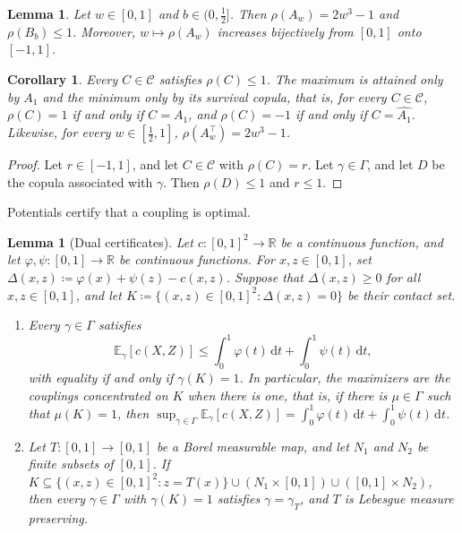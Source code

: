 \documentclass{article}
\newcommand{\E}{\mathbb{E}}
\newcommand{\CC}{\mathcal{C}}
\newcommand{\Gam}{\Gamma}
\newcommand{\R}{\mathbb{R}}
\newcommand{\de}{\,\mathrm{d}}
\newtheorem{lemma}[theorem]{Lemma}
\newtheorem{corollary}[theorem]{Corollary}
\begin{document}
\begin{lemma}
\label{lem:values}
Let $w\in[0,1]$ and $b\in(0,\frac12]$.
Then $\rho(A_w)=2w^3-1$ and $\rho(B_b)\le1$.
Moreover, $w\mapsto\rho(A_w)$ increases bijectively from $[0,1]$ onto $[-1,1]$.
\end{lemma}

\begin{corollary}
\label{cor:sharp}
Every $C\in\CC$ satisfies $\rho(C)\le1$.
The maximum is attained only by $A_1$ and the minimum only by its survival copula, that is, for every $C\in\CC$, $\rho(C)=1$ if and only if $C=A_1$, and $\rho(C)=-1$ if and only if $C=\widehat{A_1}$.
Likewise, for every $w\in[\frac12,1]$, $\rho(A_w^\top)=2w^3-1$.
\end{corollary}

\begin{proof}
Let $r\in[-1,1]$, and let $C\in\CC$ with $\rho(C)=r$.
Let $\gamma\in\Gam$, and let $D$ be the copula associated with $\gamma$.
Then $\rho(D)\le1$ and $r\le1$.
\end{proof}

Potentials certify that a coupling is optimal.

\begin{lemma}[Dual certificates]
\label{lem:dual-certificate}
Let $c:[0,1]^2\to\R$ be a continuous function, and let $\varphi,\psi:[0,1]\to\R$ be continuous functions.
For $x,z\in[0,1]$, set $\Delta(x,z)\coloneqq\varphi(x)+\psi(z)-c(x,z)$.
Suppose that $\Delta(x,z)\ge0$ for all $x,z\in[0,1]$, and let $K\coloneqq\{(x,z)\in[0,1]^2:\Delta(x,z)=0\}$ be their contact set.
\begin{enumerate}[label=(\alph*),leftmargin=2em]
\item
Every $\gamma\in\Gam$ satisfies
\[
  \E_\gamma[c(X,Z)]\le\int_0^1\varphi(t)\de t+\int_0^1\psi(t)\de t,
\]
with equality if and only if $\gamma(K)=1$.
In particular, the maximizers are the couplings concentrated on $K$ when there is one, that is, if there is $\mu\in\Gam$ such that $\mu(K)=1$, then $\sup_{\gamma\in\Gam}\E_\gamma[c(X,Z)]=\int_0^1\varphi(t)\de t+\int_0^1\psi(t)\de t$.
\item
Let $T:[0,1]\to[0,1]$ be a Borel measurable map, and let $N_1$ and $N_2$ be finite subsets of $[0,1]$.
If $K\subseteq\{(x,z)\in[0,1]^2:z=T(x)\}\cup(N_1\times[0,1])\cup([0,1]\times N_2)$, then every $\gamma\in\Gam$ with $\gamma(K)=1$ satisfies $\gamma=\gamma_T$, and $T$ is Lebesgue measure preserving.
\end{enumerate}
\end{lemma}
\end{document}
